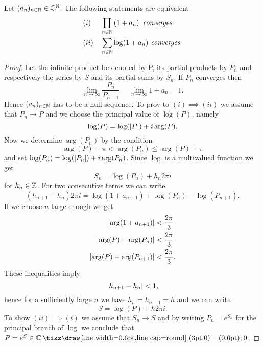 \begin{lemma}
	Let $(a_n)_{n \in \mathbb{N}} \in \mathbb{C}^{\mathbb{N}}$. The following statements are equivalent
\begin{equation*}
\begin{aligned}
	&(i) &&\prod_{n \in \mathbb{N}} \left(1 + a_n\right) \textit{ converges} \\
	&(ii) &&\sum_{n \in \mathbb{N}} \log(1 + a_n) \textit{ converges}.
\end{aligned}
\end{equation*}
\end{lemma}
\begin{proof} Let the infinite product be denoted by P, its partial products by $P_n$ and respectively the series by $S$ and its partial sums by $S_n$. If $P_n$ converges then
\begin{equation*}
	\lim\limits_{n \to \infty} \frac{P_n}{P_{n - 1}} = \lim\limits_{n \to \infty} 1 + a_n = 1.
\end{equation*}
	Hence $(a_n)_{n \in \mathbb{N}}$ has to be a null sequence. To prov to $(i) \implies (ii)$ we assume that $P_n \to P$ and we choose the principal value of $\log(P)$, namely
\begin{equation*}
	\log(P) = \log(\left|P\right|) + i \arg(P).
\end{equation*}
	Now we determine $\arg(P_n)$ by the condition
\begin{equation*}	
	\arg(P) - \pi < \arg(P_n) \leq \arg(P) + \pi
\end{equation*}
	and set $\log(P_n) = \log(\left|P_n\right|) + i \arg(P_n)$. Since $\log$ is a multivalued function we get
\begin{equation*}
	S_n = \log(P_n) + h_n 2 \pi i
\end{equation*}
	for $h_n \in \mathbb{Z}$. For two consecutive terms we can write
\begin{equation*}
	(h_{n + 1} - h_n) 2 \pi i = \log(1 + a_{n + 1}) + \log(P_n) - \log(P_{n + 1}).
\end{equation*}
	If we choose $n$ large enough we get
\begin{equation*}
\begin{aligned}
	\left|\arg(1 + a_{n + 1})\right| &< \frac{2 \pi}{3} \\
	\left|\arg(P) - \arg(P_n)\right| &< \frac{2 \pi}{3} \\
	\left|\arg(P) - \arg(P_{n + 1})\right| &< \frac{2 \pi}{3}.
\end{aligned}
\end{equation*}
	These inequalities imply
\begin{equation*}
	\left|h_{n + 1} - h_n\right| < 1,
\end{equation*}
	hence for a sufficiently large $n$ we have $h_n = h_{n + 1} = h$ and we can write
\begin{equation*}
	S = \log(P) + h 2 \pi i.
\end{equation*}
	To show $(ii) \implies (i)$ we assume that $S_n \to S$ and by writing $P_n = e^{S_n}$ for the principal branch of $\log$ we conclude that $P = e^{S} \in \field{C} \mysetminus {0}$.
\end{proof}


